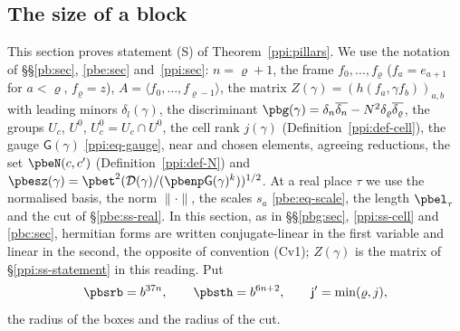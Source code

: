 \documentclass[10pt]{amsart}
\theoremstyle{definition}
\theoremstyle{remark}
\providecommand{\aubar}[1]{\overline{#1}}
\begin{document}
\subsection{The size of a block}\label{pbs:sec}

This section proves statement \textup{(S)} of Theorem~\ref{ppi:pillars}. We use the notation of
\S\S\ref{pb:sec}, \ref{pbe:sec} and~\ref{ppi:sec}: $n=\varrho+1$, the frame $f_0,\dots,f_\varrho$
($f_a=e_{a+1}$ for $a<\varrho$, $f_\varrho=z$), $A=\langle f_0,\dots,f_{\varrho-1}\rangle$, the matrix
$Z(\gamma)=(h(f_a,\gamma f_b))_{a,b}$ with leading minors $\delta_l(\gamma)$, the discriminant
$\pbg(\gamma)=\delta_n\aubar{\delta_n}-N^2\delta_\varrho\aubar{\delta_\varrho}$, the groups $U_c$, $U^0$,
$U_c^0=U_c\cap U^0$, the cell rank $j(\gamma)$ (Definition~\ref{ppi:def-cell}), the gauge $\mathsf
G(\gamma)$ \eqref{ppi:eq-gauge}, near and chosen elements, agreeing reductions, the set $\pbeN(c,c')$
(Definition~\ref{ppi:def-N}) and $\pbesz(\gamma)=\pbet^2(\mathcal D(\gamma)/(\pbenp\mathsf
G(\gamma)^k))^{1/2}$. At a real place $\tau$ we use the normalised basis, the norm $\|\cdot\|$, the
scales $s_a$ \eqref{pbe:eq-scale}, the length $\pbel_\tau$ and the cut of \S\ref{pbe:ss-real}.
In this section, as in \S\S\ref{pbg:sec}, \ref{ppi:ss-cell} and \ref{pbc:sec}, hermitian forms are
written conjugate-linear in the first variable and linear in the second, the opposite of convention
(Cv1); $Z(\gamma)$ is the matrix of \S\ref{ppi:ss-statement} in this reading.
Put
\[
\pbsrb=b^{37n},\qquad\pbsth=b^{6n+2},\qquad\mathsf j'=\min(\varrho,j),
\]
the radius of the boxes and the radius of the cut.
\end{document}
